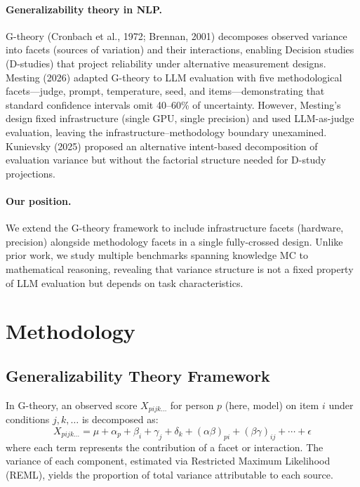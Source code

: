 \documentclass[11pt]{article}
\begin{document}
\paragraph{Generalizability theory in NLP.}
G-theory (Cronbach et al., 1972; Brennan, 2001) decomposes observed variance into facets (sources of variation) and their interactions, enabling Decision studies (D-studies) that project reliability under alternative measurement designs.
Mesting (2026) adapted G-theory to LLM evaluation with five methodological facets---judge, prompt, temperature, seed, and items---demonstrating that standard confidence intervals omit 40--60\% of uncertainty.
However, Mesting's design fixed infrastructure (single GPU, single precision) and used LLM-as-judge evaluation, leaving the infrastructure--methodology boundary unexamined.
Kunievsky (2025) proposed an alternative intent-based decomposition of evaluation variance but without the factorial structure needed for D-study projections.

\paragraph{Our position.}
We extend the G-theory framework to include infrastructure facets (hardware, precision) alongside methodology facets in a single fully-crossed design.
Unlike prior work, we study multiple benchmarks spanning knowledge MC to mathematical reasoning, revealing that variance structure is not a fixed property of LLM evaluation but depends on task characteristics.

\section{Methodology}

\subsection{Generalizability Theory Framework}

In G-theory, an observed score $X_{pijk\ldots}$ for person $p$ (here, model) on item $i$ under conditions $j, k, \ldots$ is decomposed as:
\begin{equation}
X_{pijk\ldots} = \mu + \alpha_p + \beta_i + \gamma_j + \delta_k + (\alpha\beta)_{pi} + (\beta\gamma)_{ij} + \cdots + \epsilon
\end{equation}
where each term represents the contribution of a facet or interaction.
The variance of each component, estimated via Restricted Maximum Likelihood (REML), yields the proportion of total variance attributable to each source.
\end{document}
